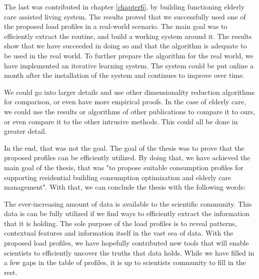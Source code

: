 The last was contributed in chapter \ref{chapter6}, by building functioning elderly care assisted living system. 
The results proved that we successfully used one of the proposed load profiles in a real-world scenario. 
The main goal was to efficiently extract the routine, and build a working system around it.
The results show that we have succeeded in doing so and that the algorithm is adequate to be used in the real world.
To further prepare the algorithm for the real world, we have implemented an iterative learning system.
The system could be put online a month after the installation of the system and continues to improve over time.

We could go into larger details and use other dimensionality reduction algorithms for comparison, or even have more empirical proofs. 
In the case of elderly care, we could use the results or algorithms of other publications to compare it to ours, or even compare it to the other intrusive methods. 
This could all be done in greater detail.

In the end, that was not the goal.
The goal of the thesis was to prove that the proposed profiles can be efficiently utilized. 
By doing that, we have achieved the main goal of the thesis,
that was "to propose suitable consumption profiles for supporting residential building consumption optimization and elderly care management".
With that, we can conclude the thesis with the following words:

The ever-increasing amount of data is available to the scientific community.
This data is can be fully utilized if we find ways to efficiently extract the information that it is holding.
The sole purpose of the load profiles is to reveal patterns, contextual features and information itself in the vast sea of data.
With the proposed load profiles, we have hopefully contributed new tools that will enable scientists to efficiently uncover the truths that data holds. 
While we have filled in a few gaps in the table of profiles, it is up to scientists community to fill in the rest.